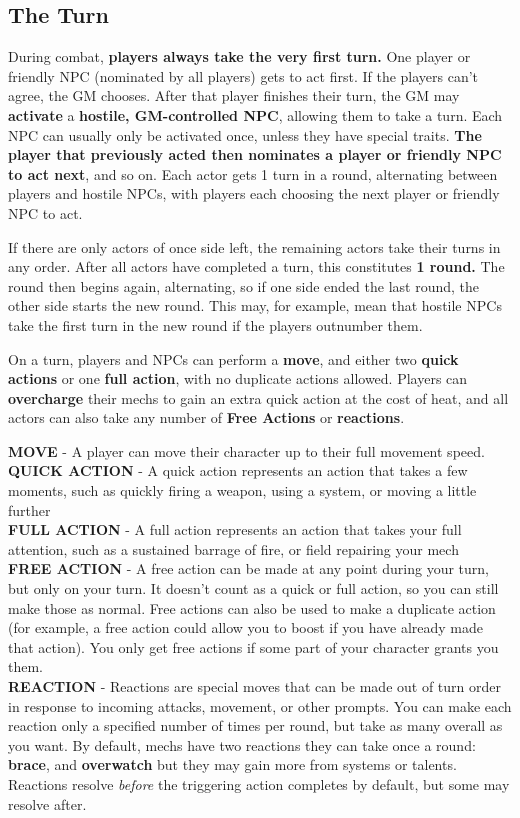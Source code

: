 \subsection{The Turn}
During combat, \textbf{players always take the very first turn.} One player or friendly NPC (nominated by all players) gets to act first. If the players can’t agree, the GM chooses. After that player finishes their turn, the GM may \textbf{activate} a \textbf{hostile, GM-controlled NPC}, allowing them to take a turn. Each NPC can usually only be activated once, unless they have special traits. \textbf{The player that previously acted then nominates a player or friendly NPC to act next}, and so on. Each actor gets 1 turn in a round, alternating between players and hostile NPCs, with players each choosing the next player or friendly NPC to act.

If there are only actors of once side left, the remaining actors take their turns in any order. After all actors have completed a turn, this constitutes \textbf{1 round.} The round then begins again, alternating, so if one side ended the last round, the other side starts the new round. This may, for example, mean that hostile NPCs take the first turn in the new round if the players outnumber them.

On a turn, players and NPCs can perform a \textbf{move}, and either two \textbf{quick actions} or one \textbf{full action}, with no duplicate actions allowed. Players can \textbf{overcharge} their mechs to gain an extra quick action at the cost of heat, and all actors can also take any number of \textbf{Free Actions} or \textbf{reactions}.

\textbf{MOVE} - A player can move their character up to their full movement speed.\\
\textbf{QUICK ACTION} - A quick action represents an action that takes a few moments, such as quickly firing a weapon, using a system, or moving a little further\\
\textbf{FULL ACTION} - A full action represents an action that takes your full attention, such as a sustained barrage of fire, or field repairing your mech\\
\textbf{FREE ACTION} - A free action can be made at any point during your turn, but only on your turn. It doesn’t count as a quick or full action, so you can still make those as normal. Free actions can also be used to make a duplicate action (for example, a free action could allow you to boost if you have already made that action). You only get free actions if some part of your character grants you them.\\
\textbf{REACTION} - Reactions are special moves that can be made out of turn order in response to incoming attacks, movement, or other prompts. You can make each reaction only a specified number of times per round, but take as many overall as you want. By default, mechs have two reactions they can take once a round: \textbf{brace}, and \textbf{overwatch} but they may gain more from systems or talents. Reactions resolve \textit{before} the triggering action completes by default, but some may resolve after.


